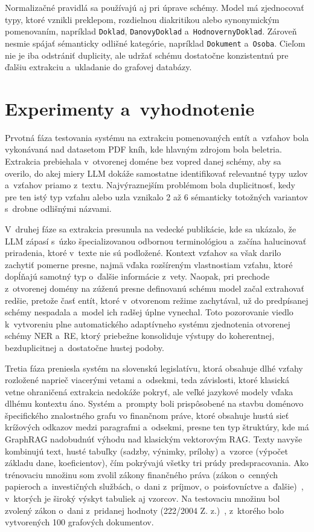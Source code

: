 Normalizačné pravidlá sa používajú aj pri úprave schémy. Model má zjednocovať typy, ktoré vznikli preklepom, rozdielnou diakritikou alebo synonymickým pomenovaním, napríklad \texttt{Doklad}, \texttt{DanovyDoklad} a~\texttt{HodnovernyDoklad}. Zároveň nesmie spájať sémanticky odlišné kategórie, napríklad \texttt{Dokument} a~\texttt{Osoba}. Cieľom nie je iba odstrániť duplicity, ale udržať schému dostatočne konzistentnú pre ďalšiu extrakciu a~ukladanie do grafovej databázy.



\section{Experimenty a~vyhodnotenie}\label{sec:experimenty}

Prvotná fáza testovania systému na extrakciu pomenovaných entít a~vzťahov bola vykonávaná nad datasetom PDF kníh, kde hlavným zdrojom bola beletria. Extrakcia prebiehala v~otvorenej doméne bez vopred danej schémy, aby sa overilo, do akej miery LLM dokáže samostatne identifikovať relevantné typy uzlov a~vzťahov priamo z~textu. Najvýraznejším problémom bola duplicitnosť, kedy pre ten istý typ vzťahu alebo uzla vznikalo 2 až 6 sémanticky totožných variantov s~drobne odlišnými názvami.

V~druhej fáze sa extrakcia presunula na vedecké publikácie, kde sa ukázalo, že LLM zápasí s~úzko špecializovanou odbornou terminológiou a~začína halucinovať priradenia, ktoré v~texte nie sú podložené. Kontext vzťahov sa však darilo zachytiť pomerne presne, najmä vďaka rozšíreným vlastnostiam vzťahu, ktoré dopĺňajú samotný typ o~ďalšie informácie z~vety. Naopak, pri prechode z~otvorenej domény na zúženú presne definovanú schému model začal extrahovať redšie, pretože časť entít, ktoré v~otvorenom režime zachytával, už do predpísanej schémy nespadala a~model ich radšej úplne vynechal. Toto pozorovanie viedlo k~vytvoreniu plne automatického adaptívneho systému zjednotenia otvorenej schémy NER a~RE, ktorý priebežne konsoliduje výstupy do koherentnej, bezduplicitnej a~dostatočne hustej podoby.

Tretia fáza preniesla systém na slovenskú legislatívu, ktorá obsahuje dlhé vzťahy rozložené naprieč viacerými vetami a~odsekmi, teda závislosti, ktoré klasická vetne ohraničená extrakcia nedokáže pokryť, ale veľké jazykové modely vďaka dlhému kontextu áno. Systém a~prompty boli prispôsobené na stavbu doménovo špecifického znalostného grafu vo finančnom práve, ktoré obsahuje hustú sieť krížových odkazov medzi paragrafmi a~odsekmi, presne ten typ štruktúry, kde má GraphRAG nadobudnúť výhodu nad klasickým vektorovým RAG. Texty navyše kombinujú text, husté tabuľky (sadzby, výnimky, prílohy) a~vzorce (výpočet základu dane, koeficientov), čím pokrývajú všetky tri prúdy predspracovania. Ako trénovaciu množinu som zvolil zákony finančného práva (zákon o~cenných papieroch a~investičných službách, o~dani z~príjmov, o~poisťovníctve a~ďalšie)~\cite{SlovLex}, v~ktorých je široký výskyt tabuliek aj vzorcov. Na testovaciu množinu bol zvolený zákon o~dani z~pridanej hodnoty (222/2004 Z. z.)~\cite{SlovLex}, z~ktorého bolo vytvorených 100 grafových dokumentov.


